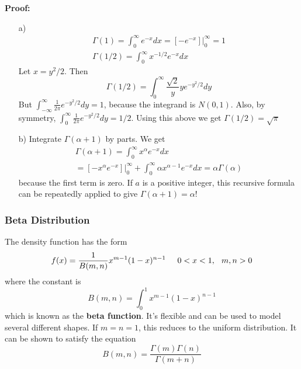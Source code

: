 \documentclass{article}
\begin{document}
\textbf{Proof:} 
\begin{itemize}
    \item[a)]  \begin{equation*}
    \begin{split}
        \Gamma(1)=\int_0^{\infty} e^{-x} dx = [-e^{-x}]\bigg|_{0}^{\infty} = 1 \\
        \Gamma(1/2) = \int_0^{\infty} x^{-1/2} e^{-x} dx 
    \end{split}
    \end{equation*}
    Let \(x=y^2/2\). Then
    \begin{equation*}
        \Gamma(1/2) = \int_0^{\infty} \frac{\sqrt{2}}{y} y e^{-y^2/2} dy
    \end{equation*}
    But \(\int_{-\infty}^{\infty} \frac{1}{2\pi} e^{-y^2/2} dy=1\), because the integrand is \(N(0,1)\). Also, by symmetry, \(\int_0^{\infty} \frac{1}{2\pi} e^{-y^2/2} dy=1/2\). Using this above we get \(\Gamma(1/2)=\sqrt{\pi}\)
    \item[b)] Integrate \(\Gamma(\alpha+1)\) by parts. We get
    \begin{equation*}
    \begin{split}
        \Gamma(\alpha+1)=\int_0^{\infty} x^\alpha e^{-x} dx\\
        = [-x^\alpha e^{-x}]\bigg|_0^{\infty} + \int_0^{\infty} \alpha x^{\alpha-1}e^{-x}dx=\alpha \Gamma(\alpha)
    \end{split}
    \end{equation*}
    because the first term is zero. If \(a\) is a positive integer, this recursive formula can be repeatedly applied to give \(\Gamma(\alpha+1)=\alpha!\)
\end{itemize}

\subsubsection{Beta Distribution}

The density function has the form
\begin{equation*}
    f(x)=\frac{1}{B(m,n)} x^{m-1}(1-x)^{n-1} \hspace{0.5cm} 0<x<1, \hspace{0.25cm} m,n>0
\end{equation*}
where the constant is
\begin{equation*}
    B(m,n)=\int_0^{1} x^{m-1}(1-x)^{n-1}
\end{equation*}
which is known as the \textbf{beta function}. It's flexible and can be used to model several different shapes. If \(m=n=1\), this reduces to the uniform distribution. It can be shown to satisfy the equation
\begin{equation*}
    B(m,n)=\frac{\Gamma(m)\Gamma(n)}{\Gamma(m+n)}
\end{equation*}
\end{document}
